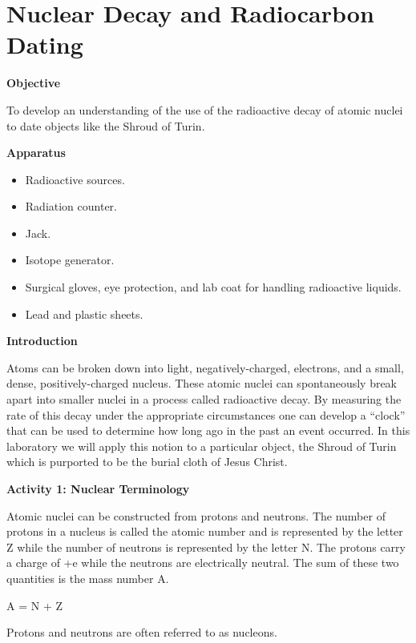 
\section{Nuclear Decay and Radiocarbon Dating}

\makelabheader %

\bigskip
\textbf{Objective}

To develop an understanding of the use of the radioactive decay of
atomic nuclei to date objects like the Shroud of Turin.

\textbf{Apparatus}

\begin{itemize}[nosep]

\item Radioactive sources.
\item Radiation counter.
\item Jack.
\item Isotope generator.
\item Surgical gloves, eye protection, and lab coat for handling radioactive liquids.
\item Lead and plastic sheets.

\end{itemize}

\textbf{Introduction}

Atoms can be broken down into light, negatively-charged, electrons,
and a small, dense, positively-charged nucleus. These atomic nuclei
can spontaneously break apart into smaller nuclei in a process called
radioactive decay. By measuring the rate of this decay under the appropriate
circumstances one can develop a {}``clock'' that can be used to
determine how long ago in the past an event occurred. In this laboratory
we will apply this notion to a particular object, the Shroud of Turin
which is purported to be the burial cloth of Jesus Christ.

\textbf{Activity 1: Nuclear Terminology }

Atomic nuclei can be constructed from protons and neutrons. The number
of protons in a nucleus is called the atomic number and is represented
by the letter Z while the number of neutrons is represented by the
letter N. The protons carry a charge of +e while the neutrons are
electrically neutral. The sum of these two quantities is the mass
number A.

{\centering A = N + Z\par}

Protons and neutrons are often referred to as nucleons.

